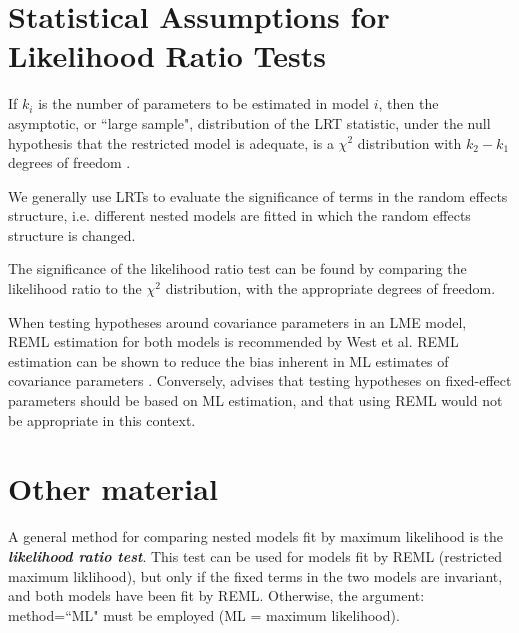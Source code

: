 \documentclass[12pt, a4paper]{report}
\theoremstyle{plain}
\theoremstyle{definition}
\theoremstyle{remark}
\begin{document}
\section{Statistical Assumptions for Likelihood Ratio Tests}


If $k_i$ is the number of parameters to be estimated in model $i$, then the asymptotic, or ``large sample", distribution of the LRT statistic, under the null hypothesis that the restricted model is adequate, is a $\chi^2$ distribution with $k_2-k_1$ degrees of freedom \citep[pg.83]{pb}.

We generally use LRTs to evaluate the significance of terms in the random effects structure, i.e. different nested models are fitted in which the random effects structure is changed.

The significance of the likelihood ratio test can be found by comparing the likelihood ratio to the $\chi^2$ distribution, with the appropriate degrees of freedom.

When testing hypotheses around covariance parameters in an LME model, REML estimation for both models is recommended by West et al. REML estimation can be shown to reduce the bias inherent in ML estimates of covariance parameters \citep{west}. Conversely, \citet{pb} advises that testing hypotheses on fixed-effect parameters should be based on ML estimation, and that using REML would not be appropriate in this context.






\section{Other material}
A general method for comparing nested models fit by maximum likelihood is the \textbf{\emph{likelihood ratio test}}. This test can be used for models fit by REML (restricted maximum liklihood), but only if the fixed terms in the two models are invariant, and both models have been fit by REML. Otherwise, the argument: method=``ML" must be employed (ML = maximum likelihood).
\end{document}

